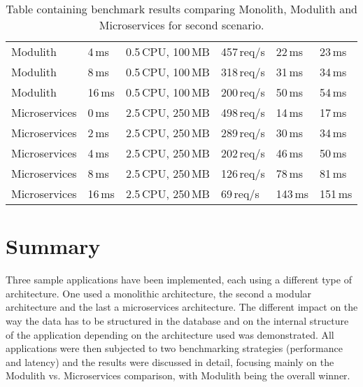 \begin{table}
\begin{tabular}{ |p{3cm}||p{1.2cm}|p{3cm}|p{1.5cm}|p{1.5cm}|p{1.5cm}| }
        Modulith      & 4\,ms         & 0.5\,CPU, 100\,MB & 457\,req/s & 22\,ms  & 23\,ms    \\ %
        Modulith      & 8\,ms         & 0.5\,CPU, 100\,MB & 318\,req/s & 31\,ms  & 34\,ms    \\ %
        Modulith      & 16\,ms        & 0.5\,CPU, 100\,MB & 200\,req/s & 50\,ms  & 54\,ms    \\ %
        \rowcolor{Gray}
        Microservices & 0\,ms         & 2.5\,CPU, 250\,MB & 498\,req/s & 14\,ms  & 17\,ms    \\ %
        Microservices & 2\,ms         & 2.5\,CPU, 250\,MB & 289\,req/s & 30\,ms  & 34\,ms    \\ %
        Microservices & 4\,ms         & 2.5\,CPU, 250\,MB & 202\,req/s & 46\,ms  & 50\,ms    \\ %
        Microservices & 8\,ms         & 2.5\,CPU, 250\,MB & 126\,req/s & 78\,ms  & 81\,ms    \\ %
        Microservices & 16\,ms        & 2.5\,CPU, 250\,MB & 69\,req/s  & 143\,ms & 151\,ms   \\ %
        \hline
    \end{tabular}
    \caption{Table containing benchmark results comparing Monolith, Modulith and Microservices for second scenario.\label{table:benchmark_scenario2_v2}}
\end{table}


\section{Summary}
Three sample applications have been implemented, each using a different type of architecture. One used a monolithic architecture, the second a modular architecture and the last a microservices architecture. The different impact on the way the data has to be structured in the database and on the internal structure of the application depending on the architecture used was demonstrated. All applications were then subjected to two benchmarking strategies (performance and latency) and the results were discussed in detail, focusing mainly on the Modulith vs. Microservices comparison, with Modulith being the overall winner.


